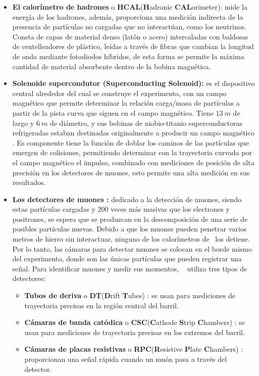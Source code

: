 \begin{itemize}
\item \textbf{El calorímetro de hadrones} o \textbf{HCAL}(\textbf{H}adronic \textbf{CAL}orimeter): mide la energía de los hadrones, además, proporciona una medición indirecta de la presencia de partículas no cargadas que no interactúan, como los neutrinos. Consta de capas de material denso (latón o acero) intercaladas con baldosas de centelleadores de plástico, leídas a través de fibras que cambian la longitud de onda mediante fotodiodos híbridos, de esta forma se permite la máxima cantidad de material absorbente dentro de la bobina magnética.

\item \textbf{Solenoide supercondutor (Superconducting Solenoid):} es el dispositivo central alrededor del cual se construye el experimento, con un campo magnético que %
permite determinar la relación carga/masa de partículas a partir de la pista curva que siguen en el campo magnético. Tiene $13~m$ de largo y $6~m$ de diámetro, y sus bobinas de niobio-titanio superconductoras refrigeradas estaban destinadas originalmente a producir un campo magnético %
. Es componente tiene la función de doblar los caminos de las partículas que emergen de colisiones, permitiendo determinar con la trayectoria curvada por el campo magnético el impulso, combinado con mediciones de posición de alta precisión en los detectores de muones, esto permite una alta medición en sus resultados.

\item \textbf{Los detectores de muones :} dedicado a la detección de muones, siendo estas partículas cargadas y 200 veces más masivas que los electrones y positrones, se espera que se produzcan en la descomposición de una serie de posibles partículas nuevas. Debido a que los muones pueden penetrar varios metros de hierro sin interactuar, ninguno de los calorímetros de \CMS ~los detiene. Por lo tanto, las cámaras para detectar muones se colocan en el borde mismo del experimento, donde son las únicas partículas que pueden registrar una señal. Para identificar muones y medir sus momentos, \CMS ~ utiliza tres tipos de detectores: 
\begin{itemize}
\item \textbf{Tubos de deriva} o \textbf{DT}(\textbf{D}rift \textbf{T}ubes) : se usan para mediciones de trayectoria precisas en la región central del barril.
\item \textbf{Cámaras de banda catódica} o \textbf{CSC}(\textbf{C}athode \textbf{S}trip \textbf{C}hambers) : se usan para mediciones de trayectoria precisas en los extremos del barril. 
\item \textbf{Cámaras de placas resistivas} o \textbf{RPC}(\textbf{R}esistive \textbf{P}late \textbf{C}hambers) : proporcionan una señal rápida cuando un muón pasa a través del detector.
\end{itemize}

\end{itemize}




